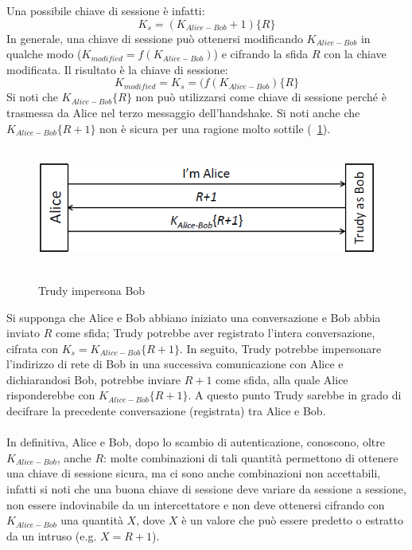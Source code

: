 Una possibile chiave di sessione è infatti:
\begin{equation}
K_{s} = (K_{Alice-Bob}+1)\lbrace R\rbrace
\end{equation}
In generale, una chiave di sessione può ottenersi modificando $K_{Alice-Bob}$ in qualche modo ($K_{modified} = f(K_{Alice-Bob})$) e cifrando la sfida $R$ con la chiave modificata. Il risultato è la chiave di sessione:
\begin{equation}
K_{modified} = K_{s} = (f(K_{Alice-Bob})\lbrace R\rbrace
\end{equation}
Si noti che $K_{Alice-Bob}\lbrace R\rbrace$ non può utilizzarsi come chiave di sessione perché è trasmessa da Alice nel terzo messaggio dell'handshake.
\newline \newline
Si noti anche che $K_{Alice-Bob}\lbrace R+1\rbrace$ non è sicura per una ragione molto sottile (\figurename~\ref{fig:ImgS65bis}).
\begin{figure}[htbp]
	\centering%
	\subfigure%
	{\includegraphics[height=4cm, width=12cm, keepaspectratio]{Immagini/autenticazione/ImgS65bis.png}}
	\caption{Trudy impersona Bob}\label{fig:ImgS65bis} 	
\end{figure}
Si supponga che Alice e Bob abbiano iniziato una conversazione e Bob abbia inviato $R$ come sfida; Trudy potrebbe aver registrato l'intera conversazione, cifrata con $K_{s} = K_{Alice-Bob}\lbrace R+1\rbrace$. In seguito, Trudy potrebbe impersonare l'indirizzo di rete di Bob in una successiva comunicazione con Alice e dichiarandosi Bob, potrebbe inviare $R+1$ come sfida, alla quale Alice risponderebbe con $K_{Alice-Bob}\lbrace R+1\rbrace$. A questo punto Trudy sarebbe in grado di decifrare la precedente conversazione (registrata) tra Alice e Bob.\\ \\
In definitiva, Alice e Bob, dopo lo scambio di autenticazione, conoscono, oltre $K_{Alice-Bob}$, anche $R$: molte combinazioni di tali quantità permettono di ottenere una chiave di sessione sicura, ma ci sono anche combinazioni non accettabili, infatti si noti che una buona chiave di sessione deve variare da sessione a sessione, non essere indovinabile da un intercettatore e non deve ottenersi cifrando con $K_{Alice-Bob}$ una quantità $X$, dove $X$ è un valore che può essere predetto o estratto da un intruso (e.g. $X = R + 1$).


